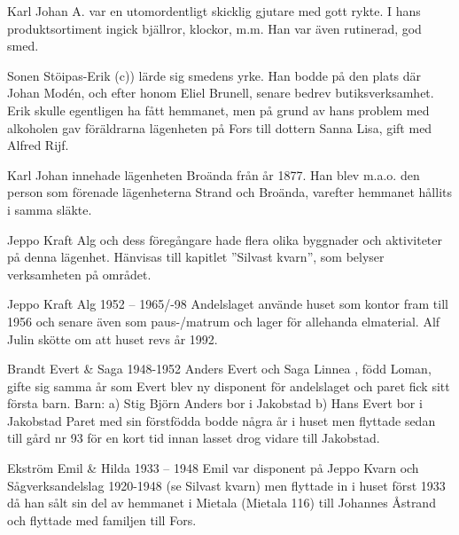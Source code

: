 Karl Johan A. var en utomordentligt skicklig gjutare med gott rykte. I hans produktsortiment ingick bjällror, klockor, m.m. Han var även rutinerad, god smed.

Sonen Stöipas-Erik (c)) lärde sig smedens yrke. Han bodde på den plats där Johan Modén, och efter honom Eliel Brunell, senare bedrev butiksverksamhet. Erik skulle egentligen ha fått hemmanet, men på grund av hans problem med alkoholen gav föräldrarna lägenheten på Fors till dottern Sanna Lisa, gift med Alfred Rijf.

Karl Johan innehade lägenheten Broända från år 1877. Han blev m.a.o. den person som förenade lägenheterna Strand och Broända, varefter hemmanet hållits i samma släkte.










Jeppo Kraft Alg och dess föregångare hade flera olika byggnader och aktiviteter på denna lägenhet. Hänvisas till kapitlet ”Silvast kvarn”, som belyser verksamheten på området.

Jeppo Kraft Alg
1952 – 1965/-98
Andelslaget använde huset som kontor fram till 1956 och senare även som paus-/matrum och lager för allehanda elmaterial. Alf Julin skötte om att huset revs år 1992.

Brandt Evert \& Saga
1948-1952
Anders Evert  och Saga Linnea , född Loman, gifte sig samma år som Evert blev ny disponent för andelslaget och paret fick sitt första barn.
Barn:
a) Stig Björn Anders  bor i Jakobstad
b) Hans Evert  bor i Jakobstad
Paret med sin förstfödda bodde några år i huset men flyttade sedan till gård nr 93 för en kort tid innan lasset drog vidare till Jakobstad.

Ekström
Emil \& Hilda 1933 – 1948
Emil var disponent på Jeppo Kvarn och Sågverksandelslag 1920-1948 (se Silvast kvarn) men flyttade in i huset först 1933 då han sålt sin del av hemmanet i Mietala (Mietala 116) till Johannes Åstrand och flyttade med familjen till Fors.



